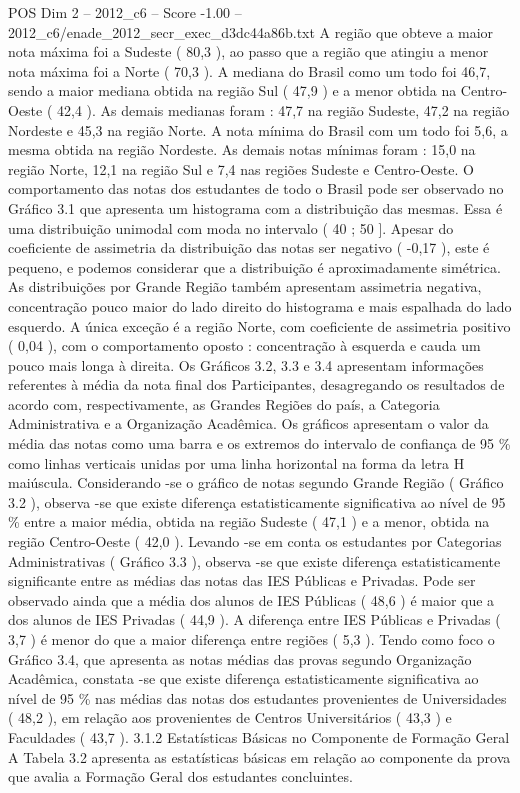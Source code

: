 \begin{textsample}{POS Dim 2 – 2012\_c6 – Score -1.00 – 2012\_c6/enade\_2012\_secr\_exec\_d3dc44a86b.txt}
A região que obteve a maior nota máxima foi a Sudeste ( 80,3 ), ao passo que a região que atingiu a menor nota máxima foi a Norte ( 70,3 ).
A mediana do Brasil como um todo foi 46,7, sendo a maior mediana obtida na região Sul ( 47,9 ) e a menor obtida na Centro-Oeste ( 42,4 ).
As demais medianas foram : 47,7 na região Sudeste, 47,2 na região Nordeste e 45,3 na região Norte.
A nota mínima do Brasil com um todo foi 5,6, a mesma obtida na região Nordeste.
As demais notas mínimas foram : 15,0 na região Norte, 12,1 na região Sul e 7,4 nas regiões Sudeste e Centro-Oeste.
O comportamento das notas dos estudantes de todo o Brasil pode ser observado no Gráfico 3.1 que apresenta um histograma com a distribuição das mesmas.
Essa é uma distribuição unimodal com moda no intervalo ( 40 ; 50 ].
Apesar do coeficiente de assimetria da distribuição das notas ser negativo ( -0,17 ), este é pequeno, e podemos considerar que a distribuição é aproximadamente simétrica.
As distribuições por Grande Região também apresentam assimetria negativa, concentração pouco maior do lado direito do histograma e mais espalhada do lado esquerdo.
A única exceção é a região Norte, com coeficiente de assimetria positivo ( 0,04 ), com o comportamento oposto : concentração à esquerda e cauda um pouco mais longa à direita.
Os Gráficos 3.2, 3.3 e 3.4 apresentam informações referentes à média da nota final dos Participantes, desagregando os resultados de acordo com, respectivamente, as Grandes Regiões do país, a Categoria Administrativa e a Organização Acadêmica.
Os gráficos apresentam o valor da média das notas como uma barra e os extremos do intervalo de confiança de 95 \% como linhas verticais unidas por uma linha horizontal na forma da letra H maiúscula.
Considerando -se o gráfico de notas segundo Grande Região ( Gráfico 3.2 ), observa -se que existe diferença estatisticamente significativa ao nível de 95 \% entre a maior média, obtida na região Sudeste ( 47,1 ) e a menor, obtida na região Centro-Oeste ( 42,0 ).
Levando -se em conta os estudantes por Categorias Administrativas ( Gráfico 3.3 ), observa -se que existe diferença estatisticamente significante entre as médias das notas das IES Públicas e Privadas.
Pode ser observado ainda que a média dos alunos de IES Públicas ( 48,6 ) é maior que a dos alunos de IES Privadas ( 44,9 ).
A diferença entre IES Públicas e Privadas ( 3,7 ) é menor do que a maior diferença entre regiões ( 5,3 ).
Tendo como foco o Gráfico 3.4, que apresenta as notas médias das provas segundo Organização Acadêmica, constata -se que existe diferença estatisticamente significativa ao nível de 95 \% nas médias das notas dos estudantes provenientes de Universidades ( 48,2 ), em relação aos provenientes de Centros Universitários ( 43,3 ) e Faculdades ( 43,7 ). 3.1.2 Estatísticas Básicas no Componente de Formação Geral A Tabela 3.2 apresenta as estatísticas básicas em relação ao componente da prova que avalia a Formação Geral dos estudantes concluintes.

\end{textsample}

